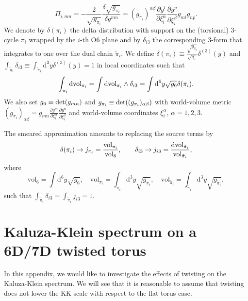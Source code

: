 \documentclass[11pt]{article}
\renewcommand{\[}{\left[}
\renewcommand{\]}{\right]}
\renewcommand{\(}{\left(}
\renewcommand{\)}{\right)}
\renewcommand{\d}{\textrm{d}}
\newcommand{\<}{\langle}
\renewcommand{\>}{\rangle}
\begin{document}
\begin{equation}
    \Pi_{i,mn} = -\frac{2}{\sqrt{g_{\pi_i}}}\frac{\delta \sqrt{g_{\pi_i}}}{\delta g^{mn}} = (g_{\pi_i})^{\alpha \beta}\frac{\partial y^l}{\partial \xi^\alpha_i}\frac{\partial y^p}{\partial \xi_i^\beta}g_{ml}g_{np}.
\end{equation}
We denote by $\delta(\pi_i)$ the delta distribution with support on the (torsional) 3-cycle $\pi_i$ wrapped by the $i$-th O6 plane and by $\delta_{i3}$ the corresponding 3-form that integrates to one over the dual chain $\tilde \pi_i$. We define $\delta(\pi_i) \equiv \frac{\sqrt{g_{\pi_i}}}{\sqrt{g_6}}\delta^{(3)}(y)$ and $\int_{\tilde \pi_i}\delta_{i3}\equiv \int_{\tilde \pi_i} \d^3 y \delta^{(3)}(y)=1$ in local coordinates such that
\begin{equation}
    \int_{\pi_i} {\rm dvol}_{\pi_i} = \int {\rm dvol}_{\pi_i }\wedge \delta_{i3} = \int \d^6 y \sqrt{g_6} \delta(\pi_i).
\end{equation}
We also set $g_6 \equiv {\rm det}(g_{mn})$ and $g_{\pi_i} \equiv {\rm det}((g_{\pi_i})_{\alpha\beta})$ with world-volume metric $(g_{\pi_i})_{\alpha \beta} = g_{mn} \frac{\partial y^m}{\partial \xi^\alpha_i}\frac{\partial y^n}{\partial \xi^\beta_i}$ and world-volume coordinates $\xi^\alpha_i$, $\alpha=1,2,3$.

The smeared approximation amounts to replacing the source terms by
\begin{equation}
    \delta (\pi_i) \to j_{\pi_i} = \frac{\text{vol}_{\pi_i}}{\text{vol}_6},\qquad \delta_{i3} \to j_{i3} = \frac{{\rm dvol}_{\tilde \pi_i}}{\text{vol}_{\tilde \pi_i}},
\end{equation}
where 
\begin{equation}
    \text{vol}_6 = \int \d^6 y \sqrt{g_6}, \quad \text{vol}_{\pi_i} = \int_{\pi_i} \d^3 y \sqrt{g_{\pi_i}}, \quad \text{vol}_{\tilde \pi_i} = \int_{\tilde \pi_i} \d^3 y \sqrt{g_{\tilde \pi_i}},
\end{equation}
such that $\int_{\tilde \pi_i} \delta_{i3} = \int_{\tilde \pi_i}j_{i3}=1$.


\section{Kaluza-Klein spectrum on a 6D/7D twisted torus}
\label{appKK}

In this appendix, we would like to investigate the effects of twisting on the Kaluza-Klein spectrum. We will see that it is reasonable to assume that twisting does not lower the KK scale with respect to the flat-torus case.
\end{document}
